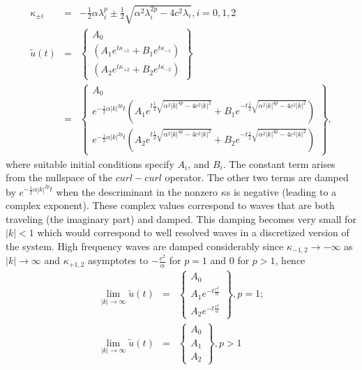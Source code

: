 \documentclass[12pt]{article}
\begin{document}
\begin{eqnarray}
\kappa_{\pm i} &=& -\frac{1}{2}\alpha\lambda_i^p \pm\frac{1}{2}\sqrt{\alpha^2\lambda_i^{2p}-4c^2\lambda_i}, i=0,1,2\\
{\tilde u(t)} &=& \left\{\begin{array}{c}A_0\\
                                    \left(A_1e^{t\kappa_{+1}} + B_1e^{t\kappa_{-1}}\right)\\
				    \left(A_2e^{t\kappa_{+2}} + B_2e^{t\kappa_{-2}}\right)\end{array}\right\}\\
              &=& \left\{\begin{array}{c}A_0\\
                                    e^{-\frac{1}{2}\alpha|k|^{2p} t}\left(A_1e^{t\frac{1}{2}\sqrt{\alpha^2|k|^{4p}-4c^2|k|^2}} +B_1e^{-t\frac{1}{2}\sqrt{\alpha^2|k|^{4p}-4c^2|k|^2}} \right)\\
                                    e^{-\frac{1}{2}\alpha|k|^{2p} t}\left(A_2e^{t\frac{1}{2}\sqrt{\alpha^2|k|^{4p}-4c^2|k|^2}} +B_2e^{-t\frac{1}{2}\sqrt{\alpha^2|k|^{4p}-4c^2|k|^2}} \right)\end{array}\right\},
\end{eqnarray}
where suitable initial conditions specify $A_i$, and $B_i$.  The
constant term arises from the nullspace of the $curl-curl$ operator.
The other two terms are damped by $e^{-\frac{1}{2}\alpha|k|^{2p} t}$
when the descriminant in the nonzero $\kappa$s is negative (leading to a
complex exponent).  These complex values correspond to waves
that are both traveling (the imaginary part) and damped.  This damping
becomes very small for $|k|<1$ which would correspond to well resolved
waves in a discretized version of the system.  High frequency waves
are damped considerably since $\kappa_{-1,2}\rightarrow -\infty$ as
$|k|\rightarrow\infty$ and $\kappa_{+1,2}$ asymptotes to
$-\frac{c^2}{\alpha}$ for $p=1$ and $0$ for $p>1$, hence
\begin{eqnarray}
\lim_{|k|\to\infty}{\tilde u(t)} &=& \left\{\begin{array}{c}A_0\\
                  A_1e^{-t\frac{c^2}{\alpha}}\\
                  A_2e^{-t\frac{c^2}{\alpha}}\end{array}\right\}, p=1;\\
\lim_{|k|\to\infty}{\tilde u(t)} &=& \left\{\begin{array}{c}A_0\\
                  A_1\\
                  A_2\end{array}\right\}, p>1
\end{eqnarray}
\end{document}
